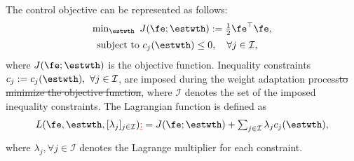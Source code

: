 \documentclass[letterpaper, journal]{IEEEtran}
\providecommand{\DIFadd}[1]{{\protect\color{blue}\uwave{#1}}} %
\providecommand{\DIFdel}[1]{{\protect\color{red}\sout{#1}}} %
\providecommand{\DIFaddbegin}{} %
\providecommand{\DIFaddend}{} %
\providecommand{\DIFdelbegin}{} %
\providecommand{\DIFdelend}{} %
\begin{document}
The control objective can be represented as follows:
\begin{equation}
    \DIFdelbegin %
\DIFdelend \DIFaddbegin \begin{matrix}
        \min_{\estwth} \ J(\fe;\estwth):= 
        \tfrac{1}{2} \fe^\top \fe
        ,
        \vspace{.5em}
        \\
        \begin{aligned}
        \text{subject to }&c_{j}(\estwth) 
        \le0, \quad \forall j\in\mathcal{I},
        \end{aligned}
    \end{matrix}\DIFaddend 
    \label{eq:opt:problem1}
\end{equation}
where $J(\fe;\estwth)$ is the objective function.
Inequality constraints $c_j:=c_j(\estwth),\ \forall j\in\mathcal{I}$, are imposed during the weight adaptation process\DIFdelbegin \DIFdel{to minimize the objective function}\DIFdelend , where $\mathcal I$ denotes the set of the imposed inequality constraints. 
The Lagrangian function \DIFaddbegin \DIFadd{$L(\cdot)$ }\DIFaddend is defined as
\begin{equation}
    L(
        \fe,\estwth,[\lambda_j]_{j\in\mathcal I}
    ) 
    \DIFdelbegin \DIFdel{:}\DIFdelend = 
    J(\fe;\estwth) 
    + 
    \textstyle\sum_{j\in\mathcal I}
    \lambda_{j}
    c_{j}(\estwth)
    ,
    \label{eq:lagrangian}
\end{equation}
where \DIFdelbegin \DIFdel{$\lambda_j,\forall j\in\mathcal{I}$ }\DIFdelend \DIFaddbegin \DIFadd{$\lambda_j,\ \forall j\in\mathcal{I}$, }\DIFaddend denotes the Lagrange multiplier for each constraint.
\end{document}
